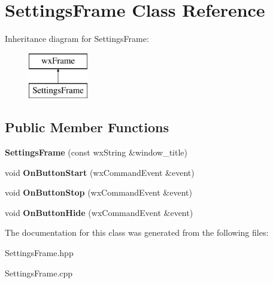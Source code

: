 \hypertarget{class_settings_frame}{}\section{Settings\+Frame Class Reference}
\label{class_settings_frame}
Inheritance diagram for Settings\+Frame\+:\begin{figure}[H]
\begin{center}
\leavevmode
\includegraphics[height=2.000000cm]{class_settings_frame}
\end{center}
\end{figure}
\subsection*{Public Member Functions}
\begin{DoxyCompactItemize}
\item 
\mbox{\label{class_settings_frame_a2550c773482cfd339d2bd31aca01da34}} 
{\bfseries Settings\+Frame} (const wx\+String \&window\+\_\+title)
\item 
\mbox{\label{class_settings_frame_aa95c364d7f22e4e067d22cbce6530f68}} 
void {\bfseries On\+Button\+Start} (wx\+Command\+Event \&event)
\item 
\mbox{\label{class_settings_frame_a0e22892da2b69fec0b8d35137cf18057}} 
void {\bfseries On\+Button\+Stop} (wx\+Command\+Event \&event)
\item 
\mbox{\label{class_settings_frame_aa3b54f55dbf67743c4ace29bd0e35a38}} 
void {\bfseries On\+Button\+Hide} (wx\+Command\+Event \&event)
\end{DoxyCompactItemize}


The documentation for this class was generated from the following files\+:\begin{DoxyCompactItemize}
\item 
Settings\+Frame.\+hpp\item 
Settings\+Frame.\+cpp\end{DoxyCompactItemize}

